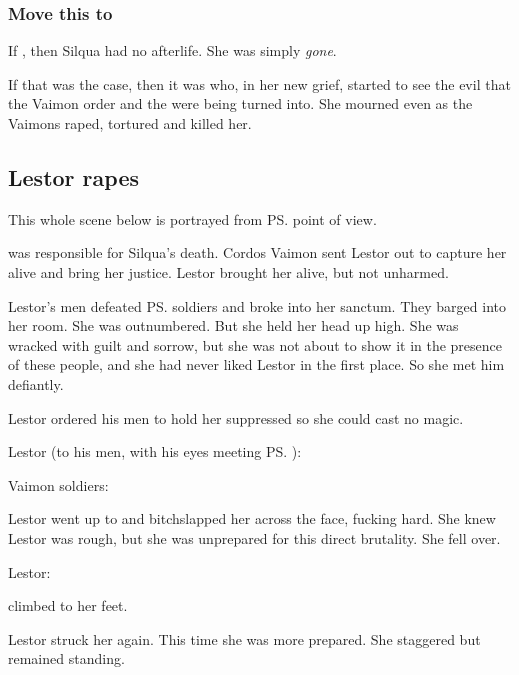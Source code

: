 \subsubsection{Move this to \Delphine}
If , then Silqua had no afterlife. 
She was simply \emph{gone}. 

If that was the case, then it was \Delphine{} who, in her new grief, started to see the evil that the Vaimon order and the \VaimonCaliphate were being turned into. 
She mourned even as the Vaimons raped, tortured and killed her. 









\subsection{Lestor rapes \Delphine}
This whole scene below is portrayed from \ps{\Delphine} point of view. 

\Delphine{} was responsible for Silqua's death. 
Cordos Vaimon sent Lestor \Delaen out to capture her alive and bring her justice. 
Lestor brought her alive, but not unharmed. 

Lestor's men defeated \ps{\Delphine}{} soldiers and broke into her sanctum. 
They barged into her room. 
She was outnumbered. 
But she held her head up high. 
She was wracked with guilt and sorrow, but she was not about to show it in the presence of these people, and she had never liked Lestor in the first place. 
So she met him defiantly. 

Lestor ordered his men to hold her suppressed so she could cast no magic. 

Lestor (to his men, with his eyes meeting \ps{\Delphine}): 

Vaimon soldiers: 

Lestor went up to \Delphine{} and bitchslapped her across the face, fucking hard. 
She knew Lestor was rough, but she was unprepared for this direct brutality. 
She fell over. 

Lestor: 

\Delphine{} climbed to her feet. 

Lestor struck her again. 
This time she was more prepared. 
She staggered but remained standing. 

